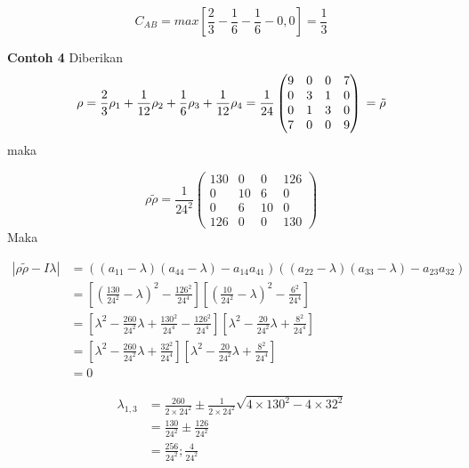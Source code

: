 \begin{equation}
	C_{AB}=max[\frac{2}{3}-\frac{1}{6}-\frac{1}{6}-0,0]=\frac{1}{3}
\end{equation}

\textbf{Contoh 4}
Diberikan
\begin{equation}
	\rho = \frac{2}{3}\rho_1 + \frac{1}{12}\rho_2
	+\frac{1}{6}\rho_3+\frac{1}{12}\rho_4\\
	=\frac{1}{24}
	\begin{pmatrix}
		9&0&0&7\\
		0&3&1&0\\
		0&1&3&0\\
		7&0&0&9
	\end{pmatrix}\\
	=\tilde{\rho}
\end{equation}
maka 

\begin{equation}
	\rho \tilde{\rho} =\frac{1}{24^2}
	\begin{pmatrix}
		130&0&0&126\\
		0&10&6&0\\
		0&6&10&0\\
		126&0&0&130
	\end{pmatrix}
\end{equation}
Maka

\begin{equation}
	\begin{aligned}
		|\rho \tilde{\rho}-I\lambda|
		&=((a_{11}-\lambda)(a_{44}-\lambda)-a_{14}a_{41})((a_{22}-\lambda)(a_{33}-\lambda)-a_{23}a_{32})\\
		&=[(\frac{130}{24^2}-\lambda)^2-\frac{126^2}{24^4}][(\frac{10}{24^2}-\lambda)^2-\frac{6^2}{24^4}]\\
		&=[\lambda^2-\frac{260}{24^2}\lambda+\frac{130^2}{24^4}-\frac{126^2}{24^4}][\lambda^2-\frac{20}{24^2}\lambda+\frac{8^2}{24^4}]\\
		&=[\lambda^2-\frac{260}{24^2}\lambda+\frac{32^2}{24^4}][\lambda^2-\frac{20}{24^2}\lambda+\frac{8^2}{24^4}]\\
		&=0
	\end{aligned}
\end{equation}

\begin{equation}
	\begin{aligned}
		\lambda_{1,3}
		&=\frac{260}{2\times24^2}\pm\frac{1}{2\times24^2}\sqrt{4\times130^2-4\times32^2}\\
		&=\frac{130}{24^2}\pm\frac{126}{24^2}\\
		&=\frac{256}{24^2}; \frac{4}{24^2}
	\end{aligned}
\end{equation}


